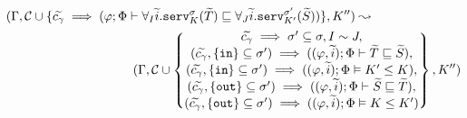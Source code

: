 \begin{table*}[!ht]
\begin{framed}
\begin{align*}
        &(\Gamma,\mathcal{C} \cup \{ \widetilde{c_\gamma} \implies (\varphi;\Phi\vdash \forall_I\widetilde{i}.\texttt{serv}^\sigma_K(\widetilde{T}) \sqsubseteq \forall_J\widetilde{i}.\texttt{serv}^{\sigma'}_{K'}(\widetilde{S}))\},K'') \leadsto\\ 
        &\kern10em(\Gamma,\mathcal{C} \cup \left\{ \begin{matrix} \widetilde{c_\gamma} \implies \sigma' \subseteq \sigma, I \sim J,\\ 
        (\widetilde{c_\gamma},\{\texttt{in}\}\subseteq \sigma') \implies ((\varphi,\widetilde{i});\Phi\vdash \widetilde{T} \sqsubseteq \widetilde{S}),\\ 
        (\widetilde{c_\gamma},\{\texttt{in}\}\subseteq \sigma') \implies ((\varphi,\widetilde{i});\Phi\vDash K' \leq K ),\\
        (\widetilde{c_\gamma},\{\texttt{out}\}\subseteq \sigma') \implies ((\varphi,\widetilde{i});\Phi\vdash \widetilde{S} \sqsubseteq \widetilde{T}),\\ 
        (\widetilde{c_\gamma},\{\texttt{out}\}\subseteq \sigma') \implies ((\varphi,\widetilde{i});\Phi\vDash K \leq K')%
        \end{matrix} \right\},K'')\\

\end{align*}
\end{framed}
\end{table*}
